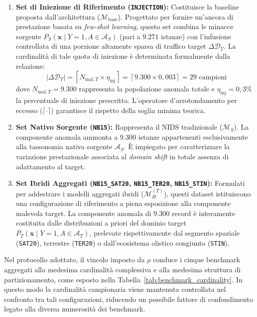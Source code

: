\begin{enumerate}
    \item \textbf{Set di Iniezione di Riferimento (\texttt{INJECTION}):} Costituisce la baseline proposta dall'architettura ($\mathcal{M}_{\text{base}}$). Progettato per fornire un'ancora di prestazione basata su \textit{few-shot learning}, questo set combina le minacce sorgente $P_S(\mathbf{x} \mid Y = 1, A \in \mathcal{A}_S)$ (pari a $9.271$ istanze) con l'infusione controllata di una porzione altamente sparsa di traffico target $\Delta\mathcal{D}_T$. La cardinalità di tale quota di iniezione è determinata formalmente dalla relazione:
    \begin{equation}
        |\Delta\mathcal{D}_T| = \left\lceil N_{\text{mal}, T} \times \eta_{\text{inj}} \right\rceil = \left\lceil 9.300 \times 0{,}003 \right\rceil = 29 \text{ campioni}
        \label{eq:target_injection_size}
    \end{equation}
    dove $N_{\text{mal}, T} = 9.300$ rappresenta la popolazione anomala totale e $\eta_{\text{inj}} = 0{,}3\%$ la percentuale di iniezione prescritta. L'operatore d'arrotondamento per eccesso ($\lceil \cdot \rceil$) garantisce il rispetto della soglia minima teorica.
    \item \textbf{Set Nativo Sorgente (\texttt{NB15}):} Rappresenta il NIDS tradizionale ($\mathcal{M}_S$). La componente anomala ammonta a $9.300$ istanze appartenenti esclusivamente alla tassonomia nativa sorgente $\mathcal{A}_S$. È impiegato per caratterizzare la variazione prestazionale associata al \textit{domain shift} in totale assenza di adattamento al target.
    \item \textbf{Set Ibridi Aggregati (\texttt{NB15\_SAT20}, \texttt{NB15\_TER20}, \texttt{NB15\_STIN}):} Formulati per addestrare i modelli aggregati ibridi ($\mathcal{M}_H^{(T)}$), questi dataset istituiscono una configurazione di riferimento a piena esposizione alla componente malevola target. La componente anomala di $9.300$ record è interamente costituita dalle distribuzioni a priori del dominio target $P_T(\mathbf{x} \mid Y = 1, A \in \mathcal{A}_T)$, prelevate rispettivamente dal segmento spaziale (\texttt{SAT20}), terrestre (\texttt{TER20}) o dall'ecosistema olistico congiunto (\texttt{STIN}).
\end{enumerate}

Nel protocollo adottato, il vincolo imposto da $\rho$ conduce i cinque benchmark aggregati alla medesima cardinalità complessiva e alla medesima struttura di partizionamento, come esposto nella Tabella~\ref{tab:benchmark_cardinality}. In questo modo la cardinalità campionaria viene mantenuta controllata nel confronto tra tali configurazioni, riducendo un possibile fattore di confondimento legato alla diversa numerosità dei benchmark.

